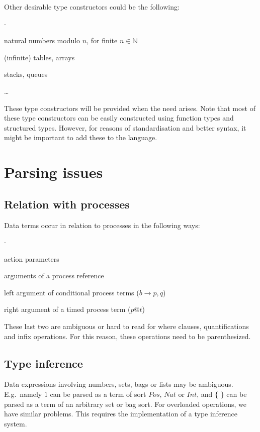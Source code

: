 \documentclass[a4paper,fleqn]{article}
\newenvironment{tdefinitions}[2][0.15em]
  {\begin{list}%
    {#2}%
    {\setlength{\parsep}{0pt}%
     \setlength{\itemsep}{#1}%
     \setlength{\leftmargin}{\mathindent}%
     \setlength{\labelwidth}{\mathindent - \labelsep}%
    }
  }
  {\end{list}}
\newcommand{\frm}[1]{\mbox{\ensuremath{#1}}}
\newcommand{\f}[1]{\ensuremath{\mathit{#1}}}
\newcommand{\To}{\ensuremath{\rightarrow}}
\newcommand{\set}[1]{\ensuremath{\{\,#1\,\}}}
\newcommand{\nat}{\ensuremath{\mathbb{N}}}
\newlength{\tlength}
\newcommand{\srtpos}{\f{Pos}}
\newcommand{\srtnat}{\f{Nat}}
\newcommand{\srtint}{\f{Int}}
\begin{document}
Other desirable type constructors could be the following:
\begin{tdefinitions}{-}
\item natural numbers modulo \frm{n}, for finite \frm{n \in \nat}
\item (infinite) tables, arrays
\item stacks, queues
\item \ldots
\end{tdefinitions}

\noindent
These type constructors will be provided when the need arises. Note that most
of these type constructors can be easily constructed using function types and
structured types. However, for reasons of standardisation and better syntax, it
might be important to add these to the language.

\section{Parsing issues}

\subsection{Relation with processes}

\noindent
Data terms occur in relation to processes in the following ways:
\begin{tdefinitions}{-}
\item action parameters
\item arguments of a process reference
\item left argument of conditional process terms (\frm{b \To p,q})
\item right argument of a timed process term (\frm{p @ t})
\end{tdefinitions}

\noindent
These last two are ambiguous or hard to read for where clauses, quantifications
and infix operations. For this reason, these operations need to be
parenthesized.

\subsection{Type inference}

Data expressions involving numbers, sets, bags or lists may be ambiguous. E.g.\
namely \frm{1} can be parsed as a term of sort \frm{\srtpos}, \frm{\srtnat} or
\frm{\srtint}, and \frm{\set{}} can be parsed as a term of an arbitrary set or
bag sort. For overloaded operations, we have similar problems. This requires
the implementation of a type inference system.
\end{document}
